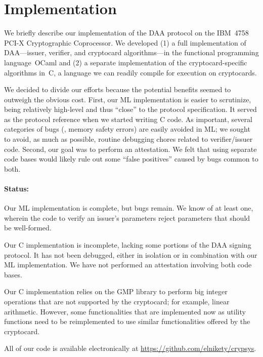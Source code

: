 \section{Implementation}

We briefly describe our implementation of the DAA protocol on the IBM~4758
PCI-X Cryptographic Coprocessor.
We developed (1) a
full implementation of DAA---issuer, verifier, and cryptocard algorithms---in the
functional programming language~OCaml and (2) a separate implementation of the cryptocard-specific algorithms in~C, a language we can readily compile
for execution on cryptocards.

We decided to divide our efforts because the potential benefits seemed to outweigh
the obvious cost.
First, our ML implementation is easier to
scrutinize, being relatively high-level and thus ``close'' to the protocol specification.
It served as the protocol reference when we started writing C code.
As important, several categories of bugs (\eg, memory safety errors) are easily avoided in ML;
we sought to avoid, as much as possible, routine debugging chores related to verifier/issuer code.
Second, our goal was to perform an attestation.
We felt that using separate code bases
would likely rule out some ``false positives'' caused
by bugs common to both.

\paragraph*{Status:}
Our ML implementation is complete, but bugs remain.
We know of at least one, wherein the code to verify an issuer's parameters
reject parameters that should be well-formed.

Our C implementation is incomplete, lacking some portions of
the DAA signing protocol. It has not been debugged, either in isolation
or in combination with our ML implementation. We have
not performed an attestation involving both code bases.

Our C implementation relies on the GMP library
to perform big integer operations that are not supported by the
cryptocard; for example, linear arithmetic. However, some functionalities that are
implemented now as utility functions need to be reimplemented to use similar
functionalities offered by the cryptocard.

All of our code is available electronically at
\url{https://github.com/elnikety/crypsys}.
